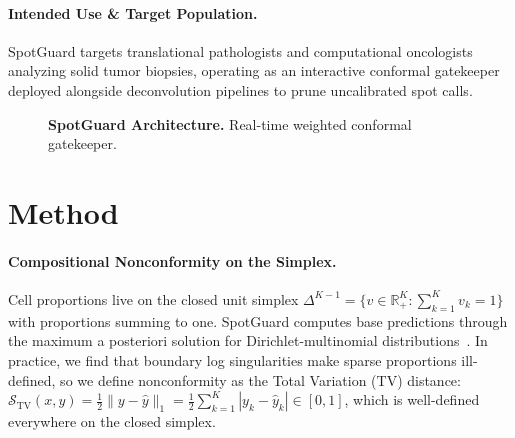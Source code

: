\documentclass[pmlr,twocolumn,10pt]{jmlr}
\newcommand{\simplex}{\Delta^{K-1}}
\begin{document}
\paragraph{Intended Use \& Target Population.}
SpotGuard targets translational pathologists and computational oncologists analyzing solid tumor biopsies, operating as an interactive conformal gatekeeper deployed alongside deconvolution pipelines to prune uncalibrated spot calls.

\begin{figure}[t]
\centering
{}
\vspace{-6pt}
\caption{\textbf{SpotGuard Architecture.} Real-time weighted conformal gatekeeper.}
\label{fig:pipeline}
\vspace{-4pt}
\end{figure}

\section{Method}
\label{sec:method}

\paragraph{Compositional Nonconformity on the Simplex.}
Cell proportions live on the closed unit simplex $\simplex = \{ v \in \mathbb{R}_+^K : \sum_{k=1}^K v_k = 1 \}$ with proportions summing to one. SpotGuard computes base predictions through the maximum a posteriori solution for Dirichlet-multinomial distributions~\citep{kleshchevnikov2022cell2location}. In practice, we find that boundary log singularities make sparse proportions ill-defined, so we define nonconformity as the Total Variation (TV) distance: $\mathcal{S}_{\text{TV}}(x, y) = \frac{1}{2} \|y - \hat{y}\|_1 = \frac{1}{2} \sum_{k=1}^K |y_k - \hat{y}_k| \in [0, 1]$, which is well-defined everywhere on the closed simplex.
\end{document}
